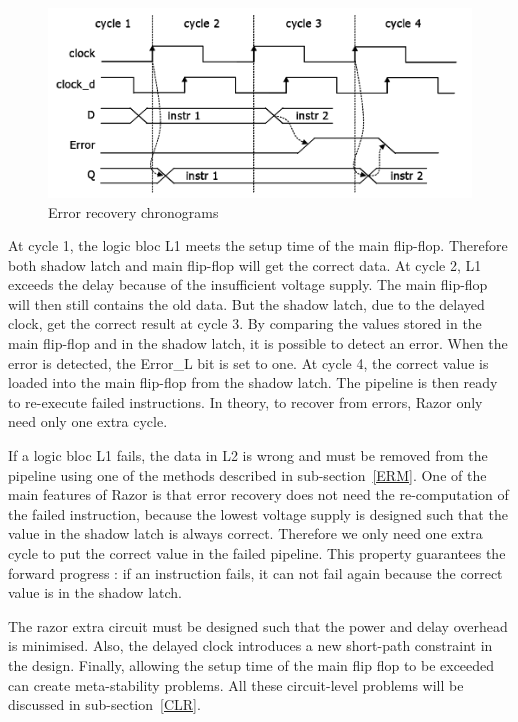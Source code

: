 \documentclass[fleqn,envcountsame,runningheads,10pt,a4paper]{llncs}
\begin{document}
\begin{figure}[!h]
    \centering
   \centerline{\includegraphics[scale=0.3]{./img/figure2.png}}
   \caption{\label{figure2}Error recovery chronograms\cite{Barthou:1998}}
\end{figure}

At cycle 1, the logic bloc L1 meets the setup time of the main
flip-flop. Therefore both shadow latch and main flip-flop will get the
correct data. At cycle 2, L1 exceeds the delay because of the
insufficient voltage supply. The main flip-flop will then still contains
the old data. But the shadow latch, due to the delayed clock, get the
correct result at cycle 3. By comparing the values stored in the main
flip-flop and in the shadow latch, it is possible to detect an error.
When the error is detected, the Error\_L bit is set to one. At cycle 4,
the correct value is loaded into the main flip-flop from the shadow
latch. The pipeline is then ready to re-execute failed instructions. In
theory, to recover from errors, Razor only need only one extra cycle. 

If a logic bloc L1 fails, the data in L2 is wrong and must be removed
from the pipeline using one of the methods described in
sub-section~\ref{ERM}. One of the main features of Razor is that error
recovery does not need the re-computation of the failed instruction,
because the lowest voltage supply is designed such that the value in the shadow latch is always correct. Therefore we only need one extra cycle to put the correct value in the failed pipeline. This property guarantees the forward progress : if an instruction fails, it can not fail again because the correct value is in the shadow latch. 

The razor extra circuit must be designed such that the power and delay overhead is minimised. Also, the delayed clock introduces a new short-path constraint in the design. Finally, allowing the setup time of the main flip flop to be exceeded can create meta-stability problems. All these circuit-level problems will be discussed in sub-section~\ref{CLR}.
\end{document}
